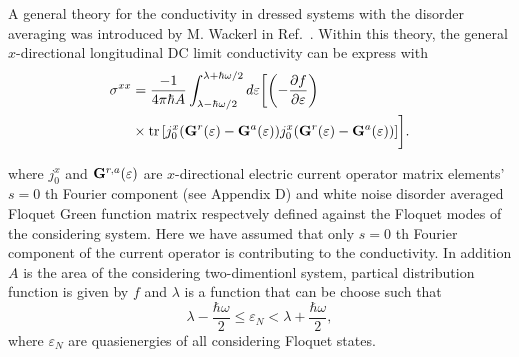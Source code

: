 
A general theory for the conductivity in dressed systems with the disorder averaging was introduced by M. Wackerl in Ref.~\cite{wackerl20,wackerlthesis20}. Within this theory, the general $x$-directional longitudinal DC limit conductivity can be express with
\begin{equation} \label{eq_20}
  \begin{aligned}
    {\sigma}^{xx} &=
    \frac{-1}{4\pi\hbar A}
    \int_{\lambda-\hbar\omega/2}^{\lambda+ \hbar\omega/2} d\varepsilon \bigg[
    \qty(
    -\frac{\partial f}{\partial \varepsilon})
    \\
    & \times
    \tr
    \qty[
    {j}^x_0
    \qty(
    \vb{G}^{r} (\varepsilon) - \vb{G}^{a} (\varepsilon)
    )
    {j}^x_0
    \qty(
    \vb{G}^{r} (\varepsilon) - \vb{G}^{a} (\varepsilon)
    )
    ]\bigg].
  \end{aligned}
\end{equation}

\noindent
where ${j}^x_0$ and $\vb{G}^{r,a} (\varepsilon)$ are $x$-directional electric current operator matrix elements' $s=0$ th Fourier component (see Appendix D) and white noise disorder averaged Floquet Green function matrix \cite{wackerl20,wackerlthesis20} respectvely defined against the Floquet modes of the considering system. Here we have assumed that only $s=0$ th Fourier component of the current operator is contributing to the conductivity. In addition $A$ is the area of the considering two-dimentionl system, partical distribution function is given by $f$ and $\lambda$ is a function that can be choose such that
\begin{equation} \label{eq_21}
    \lambda - \frac{\hbar \omega}{2}
    \leq \varepsilon_N
    <
    \lambda + \frac{\hbar \omega}{2},
\end{equation}
where $ \varepsilon_N$ are quasienergies of all considering Floquet states.

